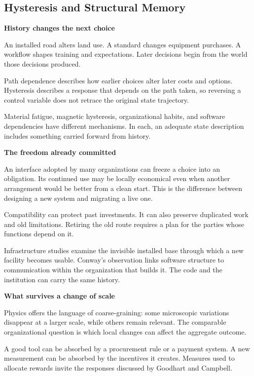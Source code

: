 \documentclass[11pt,openany]{book}
\newcommand{\subhead}[1]{\par\medskip\noindent\textbf{#1}\par\nobreak\smallskip}
\begin{document}
\subsection{Hysteresis and Structural Memory}

\subhead{History changes the next choice}

An installed road alters land use. A standard changes equipment purchases. A workflow shapes training and expectations. Later decisions begin from the world those decisions produced.

Path dependence describes how earlier choices alter later costs and options.\cite{david1985clio} Hysteresis describes a response that depends on the path taken, so reversing a control variable does not retrace the original state trajectory.

Material fatigue, magnetic hysteresis, organizational habits, and software dependencies have different mechanisms. In each, an adequate state description includes something carried forward from history.

\subhead{The freedom already committed}

An interface adopted by many organizations can freeze a choice into an obligation. Its continued use may be locally economical even when another arrangement would be better from a clean start. This is the difference between designing a new system and migrating a live one.

Compatibility can protect past investments. It can also preserve duplicated work and old limitations. Retiring the old route requires a plan for the parties whose functions depend on it.

Infrastructure studies examine the invisible installed base through which a new facility becomes usable.\cite{star1999layers} Conway's observation links software structure to communication within the organization that builds it.\cite{conway1968how} The code and the institution can carry the same history.

\subhead{What survives a change of scale}

Physics offers the language of coarse-graining: some microscopic variations disappear at a larger scale, while others remain relevant.\cite{wilson1971renormalization} The comparable organizational question is which local changes can affect the aggregate outcome.

A good tool can be absorbed by a procurement rule or a payment system. A new measurement can be absorbed by the incentives it creates. Measures used to allocate rewards invite the responses discussed by Goodhart and Campbell.\cite{goodhart1975problems,campbell1979assessing}
\end{document}
